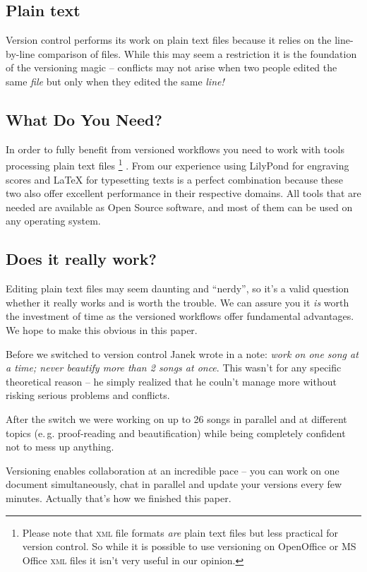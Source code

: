 \documentclass[11pt,a4paper]{article}
\begin{document}
\subsection{Plain text}
Version control performs its work on plain text files because it relies on the 
line-by-line comparison of files. While this may seem a restriction it is the
foundation of the versioning magic -- conflicts may not arise when two people edited the
same \emph{file} but only when they edited the same \emph{line!}

\subsection{What Do You Need?}
In order to fully benefit from versioned
workflows you need to work with tools processing plain text files%
\footnote{Please note that \textsc{xml} file formats \emph{are} plain text files
but less practical for version control. So while it is possible to use versioning on
OpenOffice or MS Office \textsc{xml} files it isn't very useful in our opinion.}
. From our experience
using LilyPond for engraving scores and \LaTeX{} for typesetting texts is a perfect
combination because these two also offer excellent performance in their respective domains.
All tools that are needed are available as Open Source software, and most of them can
be used on any operating system.

\subsection{Does it really work?}
Editing plain text files may seem daunting and “nerdy”, so it's a valid question
whether it really works and is worth the trouble. We can assure you it \emph{is} worth
the investment of time as the versioned workflows offer fundamental advantages.
We hope to make this obvious in this paper.

Before we switched to version control Janek wrote in a note: \emph{work on one song
at a time; \emph{never} beautify more than 2
songs at once}. This wasn't for any specific theoretical reason -- he simply realized
that he couln't manage more without risking serious problems and conflicts.

After the switch we were working on up to 26 songs in parallel and at different topics
(e.\,g. proof-reading and beautification) while being completely confident not to
mess up anything.

Versioning enables collaboration at an incredible pace -- you can work on one document
simultaneously, chat in parallel and update your versions every
few minutes. Actually that's how we finished this paper.
\end{document}
